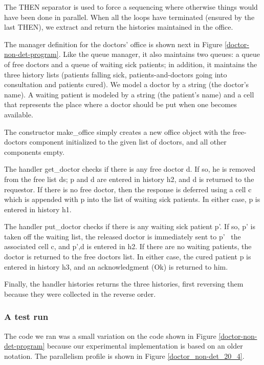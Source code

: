 The {\cf THEN} separator is used to force a sequencing where otherwise
things would have been done in parallel.  When all the loops have
terminated (ensured by the last {\cf THEN}), we extract and return the
histories maintained in the office.

The manager definition for the doctors' {\cf office} is shown next in
Figure \ref{doctor-non-det-program}.  Like the {\cf queue} manager, it
also maintains two queues: a queue of free doctors and a queue of
waiting sick patients; in addition, it maintains the three history
lists (patients falling sick, patients-and-doctors going into
consultation and patients cured).  We model a doctor by a string (the
doctor's name).  A waiting patient is modeled by a string (the
patient's name) and a cell that represents the place where a doctor
should be put when one becomes available.

The constructor {\cf make\_office} simply creates a new {\cf office}
object with the free-doctors component initialized to the given list
of doctors, and all other components empty.

The handler {\cf get\_doctor} checks if there is any free doctor
{\cf d}.  If so, he is removed from the free list {\cf ds}; {\cf p}
and {\cf d} are entered in history {\cf h2}, and {\cf d} is returned
to the requestor.  If there is no free doctor, then the response is
deferred using a cell {\cf c} which is appended with {\cf p} into the
list of waiting sick patients.  In either case, {\cf p} is entered in
history {\cf h1}.

The handler {\cf put\_doctor} checks if there is any waiting sick
patient {\cf p'}.  If so, {\cf p'} is taken off the waiting list, the
released doctor is immediately sent to {\cf p'} \via\ the associated
cell {\cf c}, and {\cf p',d} is entered in {\cf h2}.  If there are no
waiting patients, the doctor is returned to the free doctors list.  In
either case, the cured patient {\cf p} is entered in history {\cf h3},
and an acknowledgment ({\cf Ok}) is returned to him.

Finally, the handler {\cf histories\/} returns the three histories,
first reversing them because they were collected in the reverse order.

\subsubsection{A test run}

The code we ran was a small variation on the code shown in Figure
\ref{doctor-non-det-program} because our experimental implementation
is based on an older notation.  The parallelism profile is shown in
Figure \ref{doctor_non-det_20_4}.

